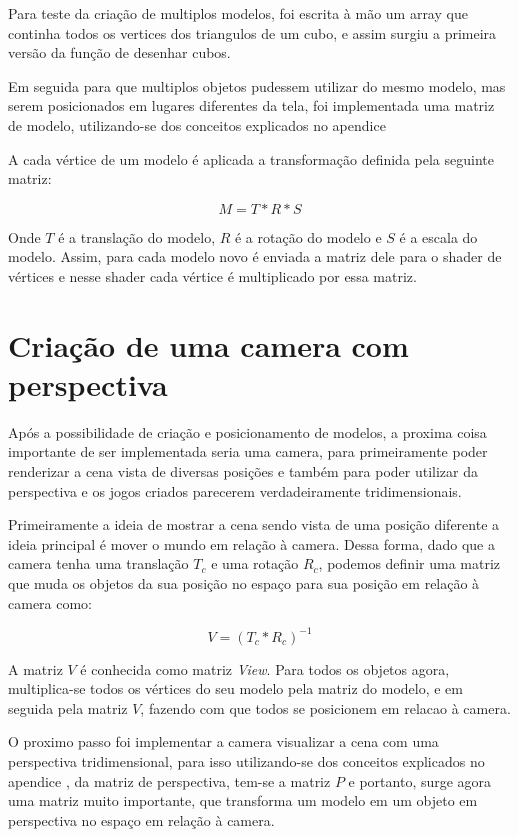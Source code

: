 Para teste da criação de multiplos modelos, foi escrita à mão um array que continha todos os vertices dos triangulos de um cubo, e assim surgiu a primeira versão da função de desenhar cubos.

Em seguida para que multiplos objetos pudessem utilizar do mesmo modelo, mas serem posicionados em lugares diferentes da tela, foi implementada uma matriz de modelo, utilizando-se dos conceitos explicados no apendice 

A cada vértice de um modelo é aplicada a transformação definida pela seguinte matriz:

\begin{equation}
  M = T * R * S
\end{equation}

Onde $T$ é a translação do modelo, $R$ é a rotação do modelo e $S$ é a escala do modelo. Assim, para cada modelo novo é enviada a matriz dele para o shader de vértices e nesse shader cada vértice é multiplicado por essa matriz.


\section{Criação de uma camera com perspectiva}

Após a possibilidade de criação e posicionamento de modelos, a proxima coisa importante de ser implementada seria uma camera, para primeiramente poder renderizar a cena vista de diversas posições e também para poder utilizar da perspectiva e os jogos criados parecerem verdadeiramente tridimensionais.

Primeiramente a ideia de mostrar a cena sendo vista de uma posição diferente a ideia principal é mover o mundo em relação à camera. Dessa forma, dado que a camera tenha uma translação $T_c$ e uma rotação $R_c$, podemos definir uma matriz que muda os objetos da sua posição no espaço para sua posição em relação à camera como:

\begin{equation}
  V = (T_c * R_c)^{-1}
\end{equation}

A matriz $V$ é conhecida como matriz \textit{View}. Para todos os objetos agora, multiplica-se todos os vértices do seu modelo pela matriz do modelo, e em seguida pela matriz $V$, fazendo com que todos se posicionem em relacao à camera.

O proximo passo foi implementar a camera visualizar a cena com uma perspectiva tridimensional, para isso utilizando-se dos conceitos explicados no apendice , da matriz de perspectiva, tem-se a matriz $P$ e portanto, surge agora uma matriz muito importante, que transforma um modelo em um objeto em perspectiva no espaço em relação à camera.

